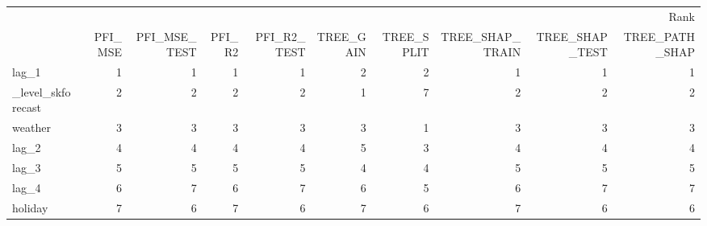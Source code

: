 \begin{tabular}{lrrrrrrrrr}
\toprule
 & \multicolumn{9}{r}{Rank} \\
 & PFI_MSE & PFI_MSE_TEST & PFI_R2 & PFI_R2_TEST & TREE_GAIN & TREE_SPLIT & TREE_SHAP_TRAIN & TREE_SHAP_TEST & TREE_PATH_SHAP \\
\midrule
lag_1 & 1 & 1 & 1 & 1 & 2 & 2 & 1 & 1 & 1 \\
_level_skforecast & 2 & 2 & 2 & 2 & 1 & 7 & 2 & 2 & 2 \\
weather & 3 & 3 & 3 & 3 & 3 & 1 & 3 & 3 & 3 \\
lag_2 & 4 & 4 & 4 & 4 & 5 & 3 & 4 & 4 & 4 \\
lag_3 & 5 & 5 & 5 & 5 & 4 & 4 & 5 & 5 & 5 \\
lag_4 & 6 & 7 & 6 & 7 & 6 & 5 & 6 & 7 & 7 \\
holiday & 7 & 6 & 7 & 6 & 7 & 6 & 7 & 6 & 6 \\
\bottomrule
\end{tabular}
